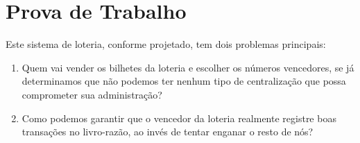 \chapter{Prova de Trabalho}
\label{ch:capitulo3}






Este sistema de loteria, conforme projetado, tem dois problemas principais:

\begin{samepage}
\begin{enumerate}
\item Quem vai vender os bilhetes da loteria e escolher os números vencedores, se já determinamos que não podemos ter nenhum tipo de centralização que possa comprometer sua administração?
\item Como podemos garantir que o vencedor da loteria realmente registre boas transações no livro-razão, ao invés de tentar enganar o resto de nós?
\end{enumerate}
\end{samepage}

